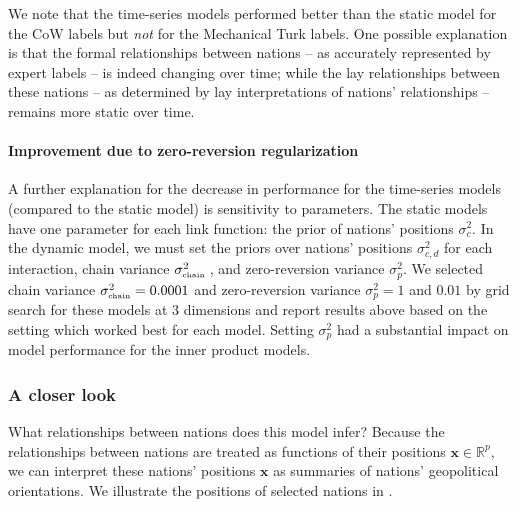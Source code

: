 We note that the time-series models performed better than the static
model for the CoW labels but \emph{not} for the Mechanical Turk
labels.  One possible explanation is that the formal relationships
between nations -- as accurately represented by expert labels -- is
indeed changing over time; while the lay relationships between these
nations -- as determined by lay interpretations of nations'
relationships -- remains more static over time.

\paragraph{Improvement due to zero-reversion regularization}
A further explanation for the decrease in performance for the
time-series models (compared to the static model) is sensitivity to
parameters.  The static models have one parameter for each link
function: the prior of nations' positions $\sigma_{c}^2$.  In the
dynamic model, we must set the priors over nations' positions
$\sigma_{c,d}^2$ for each interaction, chain variance
$\sigma_{\mbox{\tiny chain }}^2$, and zero-reversion variance
$\sigma_{p}^2$.  We selected chain variance $\sigma_{\mbox{\tiny
    chain}}^2=0.0001$ and zero-reversion variance $\sigma_p^2=1$ and
$0.01$ by grid search for these models at $3$ dimensions and report
results above based on the setting which worked best for each model.
Setting $\sigma_p^2$ had a substantial impact on model performance for
the inner product models.

\subsubsection{A closer look}
What relationships between nations does this model infer?  Because the
relationships between nations are treated as functions of their
positions $\bm x \in \mathbb{R}^p$, we can interpret these nations'
positions $\bm x$ as summaries of nations' geopolitical
orientations.  We illustrate the positions of selected nations in
.

